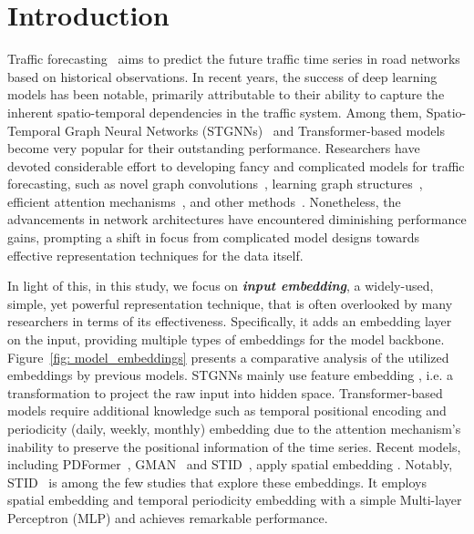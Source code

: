 \documentclass[sigconf]{acmart}
\begin{document}
\section{Introduction}
Traffic forecasting~\cite{jiang2021dl} aims to predict the future traffic time series in road networks based on historical observations. In recent years, the success of deep learning models has been notable, primarily attributable to their ability to capture the inherent spatio-temporal dependencies in the traffic system. Among them, Spatio-Temporal Graph Neural Networks (STGNNs)~\cite{STGCN, DCRNN} and Transformer-based models~\cite{ASTGCN, GMAN, STTN, PDFormer} become very popular for their outstanding performance. Researchers have devoted considerable effort to developing fancy and complicated models for traffic forecasting, such as novel graph convolutions~\cite{StemGNN, STSGCN, STFGNN, STMGCN, CCRNN, DMSTGCN, STGNN, TGCN, Z-GCNETs, HGCN, AutoSTGCN, STGODE, STAGGCN}, learning graph structures~\cite{GWNet, MegaCRN, GTS, MTGNN, SLCNN}, efficient attention mechanisms~\cite{STWA, Informer, Autoformer, Pyraformer, FEDformer}, and other methods~\cite{STMetaNet, D2STGNN, PMMemNet, EnhanceNet, AutoSTG, STEP}. Nonetheless, the advancements in network architectures have encountered diminishing performance gains, prompting a shift in focus from complicated model designs towards effective representation techniques for the data itself. 



In light of this, in this study, we focus on \textbf{\textit{input embedding}}, a widely-used, simple, yet powerful representation technique, that is often overlooked by many researchers in terms of its effectiveness. Specifically, it adds an embedding layer on the input, providing multiple types of embeddings for the model backbone. Figure~\ref{fig: model_embeddings} presents a comparative analysis of the utilized embeddings by previous models. STGNNs mainly use feature embedding , i.e. a transformation to project the raw input into hidden space. Transformer-based models require additional knowledge such as temporal positional encoding  and periodicity (daily, weekly, monthly) embedding  due to the attention mechanism's inability to preserve the positional information of the time series. Recent models, including PDFormer~\cite{PDFormer}, GMAN~\cite{GMAN} and STID~\cite{STID}, apply spatial embedding . Notably, STID~\cite{STID} is among the few studies that explore these embeddings. It employs spatial embedding and temporal periodicity embedding with a simple Multi-layer Perceptron (MLP) and achieves remarkable performance.
\end{document}
